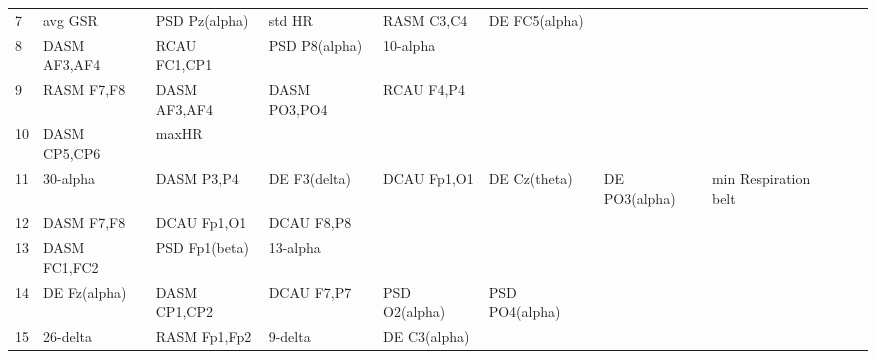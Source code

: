\begin{landscape}
\begin{table}[]
\begin{tabular}{l|llllllll}
7        & avg GSR               & PSD Pz(alpha)         & std HR               & RASM C3,C4              & DE FC5(alpha)           &                      &                      &                       &                       &                    \\
8        & DASM AF3,AF4          & RCAU FC1,CP1          & PSD P8(alpha)        & 10-alpha                &                         &                      &                      &                       &                       &                    \\
9        & RASM F7,F8            & DASM AF3,AF4          & DASM PO3,PO4         & RCAU F4,P4              &                         &                      &                      &                       &                       &                    \\
10       & DASM CP5,CP6          & maxHR                 &                      &                         &                         &                      &                      &                       &                       &                    \\
11       & 30-alpha              & DASM P3,P4            & DE F3(delta)         & DCAU Fp1,O1             & DE Cz(theta)            & DE PO3(alpha)        & min Respiration belt &                       &                       &                    \\
12       & DASM F7,F8            & DCAU Fp1,O1           & DCAU F8,P8           &                         &                         &                      &                      &                       &                       &                    \\
13       & DASM FC1,FC2          & PSD Fp1(beta)         & 13-alpha             &                         &                         &                      &                      &                       &                       &                    \\
14       & DE Fz(alpha)          & DASM CP1,CP2          & DCAU F7,P7           & PSD O2(alpha)           & PSD PO4(alpha)          &                      &                      &                       &                       &                    \\
15       & 26-delta              & RASM Fp1,Fp2          & 9-delta              & DE C3(alpha)            &                         &                      &                      &                       &                       &                    \\

\end{tabular}
\end{table}
\end{landscape}

